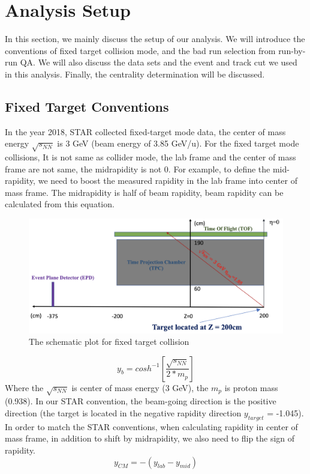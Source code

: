 \section{Analysis Setup}
In this section, we mainly discuss the setup of our analysis. We will introduce the conventions of fixed target collision mode, and the bad run selection from run-by-run QA.
We will also discuss the data sets and the event and track cut we used in this analysis. Finally, the centrality determination will be discussed.
\subsection{Fixed Target Conventions}
In the year 2018, STAR collected fixed-target mode data, the center of mass energy $\sqrt{s_{NN}}$ is 3 GeV (beam energy of 3.85 GeV/u). For the fixed target mode collisions, It is not same as collider mode, the lab frame and the center of mass frame are not same, the midrapidity is not 0. For example, to define the mid-rapidity, we need to boost the measured rapidity in the lab frame into center of mass frame. The midrapidity is half of beam rapidity, beam rapidity can be calculated from this equation.

\begin{figure}
    \centering
    \includegraphics[scale=0.5]{FXT3gev/chapter1/fig/FXT_schematic.jpg}
    \caption{The schematic plot for fixed target collision}
    \label{fig:FXT_schematic}
\end{figure}

\begin{equation}
	y_{b} = cosh^{-1} \left[ \frac{\sqrt{s_{NN}}}{2*m_{p}} \right]
	\label{beamy_cal}
\end{equation}
Where the $\sqrt{s_{NN}}$ is center of mass energy (3 GeV), the $m_{p}$ is proton mass (0.938). In our STAR convention, the beam-going direction is the positive direction (the target is located in the negative rapidity direction $y_{target}$ = -1.045). In order to match the STAR conventions, when calculating rapidity in center of mass frame, in addition to shift by midrapidity, we also need to flip the sign of rapidity. 
\begin{equation}
	y_{CM} = -(y_{lab}-y_{mid})
	\label{rap_convention}
\end{equation}

